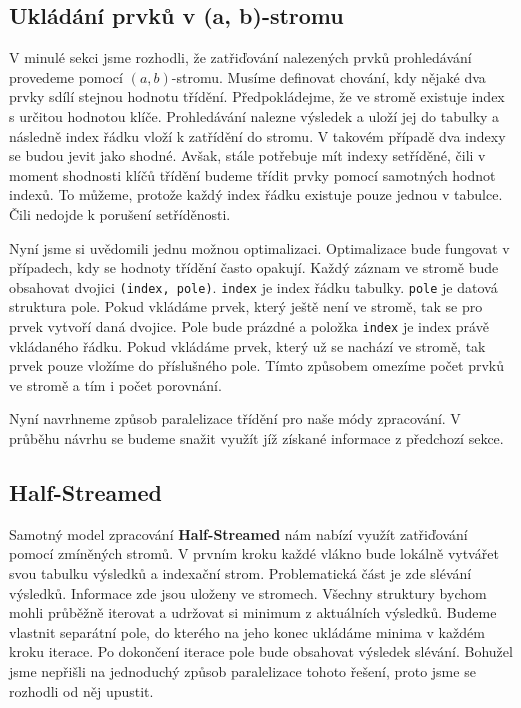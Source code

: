 \subsection{Ukládání prvků v (a, b)-stromu} \label{anal.improvement.orderby.storeindex}

V minulé sekci jsme rozhodli, že zatřiďování nalezených prvků prohledávání provedeme pomocí $(a, b)$-stromu.
Musíme definovat chování, kdy nějaké dva prvky sdílí stejnou hodnotu třídění.
Předpokládejme, že ve stromě existuje index s určitou hodnotou klíče.
Prohledávání nalezne výsledek a uloží jej do tabulky a následně index řádku vloží k zatřídění do stromu.
V takovém případě dva indexy se budou jevit jako shodné.
Avšak, stále potřebuje mít indexy setříděné, čili v moment shodnosti klíčů třídění budeme třídit prvky pomocí samotných hodnot indexů.
To můžeme, protože každý index řádku existuje pouze jednou v tabulce.
Čili nedojde k porušení setříděnosti.

Nyní jsme si uvědomili jednu možnou optimalizaci.
Optimalizace bude fungovat v případech, kdy se hodnoty třídění často opakují.
Každý záznam ve stromě bude obsahovat dvojici \texttt{(index, pole)}.
\texttt{index} je index řádku tabulky.
\texttt{pole} je datová struktura pole.
Pokud vkládáme prvek, který ještě není ve stromě, tak se pro prvek vytvoří daná dvojice.
Pole bude prázdné a položka \texttt{index} je index právě vkládaného řádku.
Pokud vkládáme prvek, který už se nachází ve stromě, tak prvek pouze vložíme do příslušného pole.
Tímto způsobem omezíme počet prvků ve stromě a tím i počet porovnání.

Nyní navrhneme způsob paralelizace třídění pro naše módy zpracování.
V průběhu návrhu se budeme snažit využít jíž získané informace z předchozí sekce.

\subsection{Half-Streamed} \label{anal.improvement.orderby.halfstreamed}

Samotný model zpracování \textbf{Half-Streamed} nám nabízí využít zatřiďování pomocí zmíněných stromů.
V prvním kroku každé vlákno bude lokálně vytvářet svou tabulku výsledků a indexační strom.
Problematická část je zde slévání výsledků.
Informace zde jsou uloženy ve stromech.
Všechny struktury bychom mohli průběžně iterovat a udržovat si minimum z aktuálních výsledků.
Budeme vlastnit separátní pole, do kterého na jeho konec ukládáme minima v každém kroku iterace.
Po dokončení iterace pole bude obsahovat výsledek slévání.
Bohužel jsme nepřišli na jednoduchý způsob paralelizace tohoto řešení, proto jsme se rozhodli od něj upustit.

